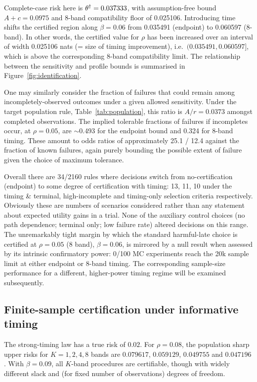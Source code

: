 \begin{table}[!htbp]\centering
\caption{Population decision value at $\rho=0.05$ and $\beta=0.06$ for the timing-and-terminal harmful-late law. Information quantities are in nats. A decision is a sharp population statement, without sampling uncertainty.}\label{tab:population}

\end{table}

Complete-case risk here is $\theta^\dagger = 0.037333$, with assumption-free bound $A+c = 0.0975$ and 8-band compatibility floor of 0.025106. Introducing time shifts the certified region along $\beta = 0.06$ from 0.035491 (endpoint) to 0.060597 (8-band). In other words, the certified value for $\rho$ has been increased over an interval of width 0.025106 nats (= size of timing improvement), i.e.\ $(0.035491,0.060597]$, which is above the corresponding 8-band compatibility limit. The relationship between the sensitivity and profile bounds is summarised in Figure~\ref{fig:identification}.

One may similarly consider the fraction of failures that could remain among incompletely-observed outcomes under a given allowed sensitivity. Under the target population rule, Table~\ref{tab:population}, this ratio is $A/r=0.0373$ amongst completed observations. The implied tolerable fractions of failures if incompletes occur, at $\rho=0.05$, are $\sim$0.493 for the endpoint bound and 0.324 for 8-band timing. These amount to odds ratios of approximately 25.1 / 12.4 against the fraction of known failures, again purely bounding the possible extent of failure given the choice of maximum tolerance.

Overall there are 34/2160 rules where decisions switch from no-certification (endpoint) to some degree of certification with timing: 13, 11, 10 under the timing \& terminal, high-incomplete and timing-only selection criteria respectively. Obviously these are numbers of scenarios considered rather than any statement about expected utility gains in a trial. None of the auxiliary control choices (no path dependence; terminal only; low failure rate) altered decisions on this range. The unremarkably tight margin by which the standard harmful-late choice is certified at $\rho=0.05$ (8 band), $\beta=0.06$, is mirrored by a null result when assessed by its intrinsic confirmatory power: 0/100 MC experiments reach the 20k sample limit at either endpoint or 8-band timing. The corresponding sample-size performance for a different, higher-power timing regime will be examined subsequently.
\subsection{Finite-sample certification under informative timing}
The strong-timing law has a true risk of $0.02$. For $\rho=0.08$, the population sharp upper risks for $K=1,2,4,8$ bands are $0.079617$, $0.059129$, $0.049755$ and $0.047196$. With $\beta=0.09$, all $K$-band procedures are certifiable, though with widely different slack and (for fixed number of observations) degrees of freedom.

